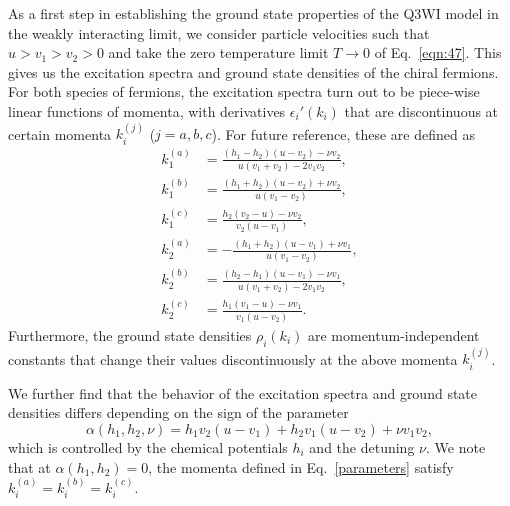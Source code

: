 \documentclass[aps,pra,
superscriptaddress,
reprint,twocolumn,preprintnumbers,
amsmath,amssymb,
nofootinbib]{revtex4-1}
\begin{document}
As a first step in establishing the ground state properties of the Q3WI model in the weakly interacting limit, we consider particle velocities such that $u > v_1 > v_2 > 0$ and take the zero temperature limit $T\to 0$ of Eq.~\eqref{eqn:47}. This gives us the excitation spectra and ground state densities of the chiral fermions. For both species of fermions, the excitation spectra turn out to be piece-wise linear functions of momenta, with derivatives $\epsilon_i'(k_i)$ that are discontinuous at certain momenta $k_i^{(j)}$ ($j = a,b,c$).
For future reference, these are defined as
		 \begin{align}
       	 \label{parameters}
       	 k_1^{(a)} &= \frac{\left(h_1-h_2\right) \left(u-v_2\right)-\nu  v_2}{u (v_1+v_2) -2 v_1 v_2}, \nonumber \\
       	 k_1^{(b)} &= \frac{\left(h_1+h_2\right) \left(u-v_2\right)+\nu  v_2}{u \left(v_1-v_2\right)}, \nonumber \\
       	 k_1^{(c)} &= \frac{h_2 \left(v_2-u\right)-\nu  v_2}{v_2 \left(u-v_1\right)}, \nonumber \\
       	 k_2^{(a)} &= -\frac{\left(h_1+h_2\right) \left(u-v_1\right)+\nu  v_1}{u \left(v_1-v_2\right)}, \nonumber \\
         k_2^{(b)} &= \frac{\left(h_2-h_1\right) \left(u-v_1\right)-\nu  v_1}{u \left(v_1+v_2\right)-2 v_1 v_2}, \nonumber \\
         k_2^{(c)} &= \frac{h_1 \left(v_1-u\right)-\nu  v_1}{v_1 \left(u-v_2\right)}.
         \end{align}
Furthermore, the ground state densities $\rho_i(k_i)$ are momentum-independent constants that change their values discontinuously at the above momenta $k_i^{(j)}$.

We further find that the behavior of the excitation spectra and ground state densities differs depending on the sign of the parameter
	\begin{equation}
	\label{alpha}
	\alpha(h_1,h_2,\nu) = h_1 v_2 (u-v_1) + h_2 v_1(u - v_2) + \nu v_1 v_2 ,
	\end{equation}
which is controlled by the chemical potentials $h_i$ and the detuning $\nu$. We note that at $\alpha(h_1,h_2)= 0$, the momenta defined in Eq.~\eqref{parameters} satisfy $k_i^{(a)} =k_i^{(b)}=k_i^{(c)}$.
\end{document}
